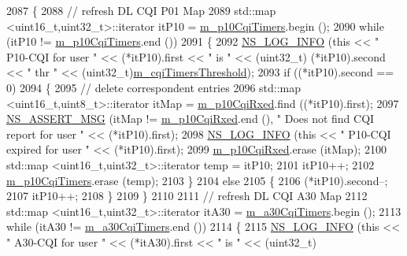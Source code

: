 \begin{DoxyCode}
2087 \{
2088   \textcolor{comment}{// refresh DL CQI P01 Map}
2089   std::map <uint16\_t,uint32\_t>::iterator itP10 = \hyperlink{classns3_1_1TdTbfqFfMacScheduler_aaf5d854702133742423180538d27f6f1}{m\_p10CqiTimers}.begin ();
2090   \textcolor{keywordflow}{while} (itP10 != \hyperlink{classns3_1_1TdTbfqFfMacScheduler_aaf5d854702133742423180538d27f6f1}{m\_p10CqiTimers}.end ())
2091     \{
2092       \hyperlink{group__logging_gafbd73ee2cf9f26b319f49086d8e860fb}{NS\_LOG\_INFO} (\textcolor{keyword}{this} << \textcolor{stringliteral}{" P10-CQI for user "} << (*itP10).first << \textcolor{stringliteral}{" is "} << (uint32\_t)
      (*itP10).second << \textcolor{stringliteral}{" thr "} << (uint32\_t)\hyperlink{classns3_1_1TdTbfqFfMacScheduler_a4a154b47a91bb301ab183ce57e44c431}{m\_cqiTimersThreshold});
2093       \textcolor{keywordflow}{if} ((*itP10).second == 0)
2094         \{
2095           \textcolor{comment}{// delete correspondent entries}
2096           std::map <uint16\_t,uint8\_t>::iterator itMap = \hyperlink{classns3_1_1TdTbfqFfMacScheduler_afadf1919ebd3f749f973a94088ff74dc}{m\_p10CqiRxed}.find ((*itP10).first);
2097           \hyperlink{assert_8h_aff5ece9066c74e681e74999856f08539}{NS\_ASSERT\_MSG} (itMap != \hyperlink{classns3_1_1TdTbfqFfMacScheduler_afadf1919ebd3f749f973a94088ff74dc}{m\_p10CqiRxed}.end (), \textcolor{stringliteral}{" Does not find CQI report
       for user "} << (*itP10).first);
2098           \hyperlink{group__logging_gafbd73ee2cf9f26b319f49086d8e860fb}{NS\_LOG\_INFO} (\textcolor{keyword}{this} << \textcolor{stringliteral}{" P10-CQI expired for user "} << (*itP10).first);
2099           \hyperlink{classns3_1_1TdTbfqFfMacScheduler_afadf1919ebd3f749f973a94088ff74dc}{m\_p10CqiRxed}.erase (itMap);
2100           std::map <uint16\_t,uint32\_t>::iterator temp = itP10;
2101           itP10++;
2102           \hyperlink{classns3_1_1TdTbfqFfMacScheduler_aaf5d854702133742423180538d27f6f1}{m\_p10CqiTimers}.erase (temp);
2103         \}
2104       \textcolor{keywordflow}{else}
2105         \{
2106           (*itP10).second--;
2107           itP10++;
2108         \}
2109     \}
2110 
2111   \textcolor{comment}{// refresh DL CQI A30 Map}
2112   std::map <uint16\_t,uint32\_t>::iterator itA30 = \hyperlink{classns3_1_1TdTbfqFfMacScheduler_a208160933cb6d934c6cfb8114734226a}{m\_a30CqiTimers}.begin ();
2113   \textcolor{keywordflow}{while} (itA30 != \hyperlink{classns3_1_1TdTbfqFfMacScheduler_a208160933cb6d934c6cfb8114734226a}{m\_a30CqiTimers}.end ())
2114     \{
2115       \hyperlink{group__logging_gafbd73ee2cf9f26b319f49086d8e860fb}{NS\_LOG\_INFO} (\textcolor{keyword}{this} << \textcolor{stringliteral}{" A30-CQI for user "} << (*itA30).first << \textcolor{stringliteral}{" is "} << (uint32\_t)

\end{DoxyCode}
